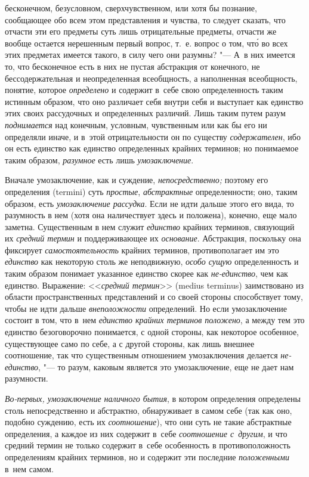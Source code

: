 бесконечном, безусловном, сверхчувственном, или хотя бы познание,
сообщающее обо всем этом представления и чувства, то следует сказать, что
отчасти эти его предметы суть лишь отрицательные предметы, отчасти же
вообще остается нерешенным первый вопрос, т.~е. вопрос о том, чт\'{о} во всех
этих предметах имеется такого, в силу чего они разумны? "--- А~в них имеется
то, что бесконечное есть в них не пустая абстракция от конечного, не
бессодержательная и неопределенная всеобщность, а наполненная всеобщность,
понятие, которое {\em определено} и содержит в~себе свою определенность таким
истинным образом, что оно различает себя внутри себя и выступает как единство
этих своих рассудочных и определенных различий. Лишь таким путем разум
{\em поднимается} над конечным, условным, чувственным или как бы его ни
определяли иначе, и в~этой отрицательности он по существу {\em содержателен},
ибо он есть единство как единство определенных крайних терминов; но понимаемое
таким образом, {\em разумное} есть лишь {\em умозаключение}.

Вначале умозаключение, как и суждение, {\em непосредственно;} поэтому его
определения (termini) суть {\em простые}, {\em абстрактные} определенности;
оно, таким образом, есть {\em умозаключение рассудка}. Если не идти дальше
этого его вида, то разумность в нем (хотя она наличествует здесь и положена),
конечно, еще мало заметна. Существенным в нем служит {\em единство} крайних
терминов, связующий их {\em средний термин} и поддерживающее их
{\em основание}. Абстракция, поскольку она фиксирует {\em самостоятельность}
крайних терминов, противополагает им это {\em единство} как некоторую столь же
неподвижную, {\em особо сущую} определенность и таким образом понимает
указанное единство скорее как {\em не-единство}, чем как единство. Выражение:
<<{\em средний термин}>> (medius terminus) заимствовано из области
пространственных представлений и со своей стороны способствует тому, чтобы не
идти дальше {\em внеположности} определений. Но если умозаключение состоит в
том, что в~нем {\em единство крайних терминов положено}, а между тем это
единство безоговорочно понимается, с одной стороны, как некоторое особенное,
существующее само по себе, а с другой стороны, как лишь внешнее соотношение,
так что существенным отношением умозаключения делается {\em не-единство}, "---
то разум, каковым является это умозаключение, еще не дает нам разумности.

{\em Во-первых, умозаключение наличного бытия},
в котором определения определены столь непосредственно и
абстрактно, обнаруживает в самом себе (так как оно, подобно суждению, есть
их {\em соотношение}), что они суть не такие абстрактные определения, а каждое
из них содержит в~себе {\em соотношение с~другим}, и что средний термин не
только содержит в~себе особенность в противоположность определениям крайних
терминов, но и содержит эти последние {\em положенными} в~нем самом.

